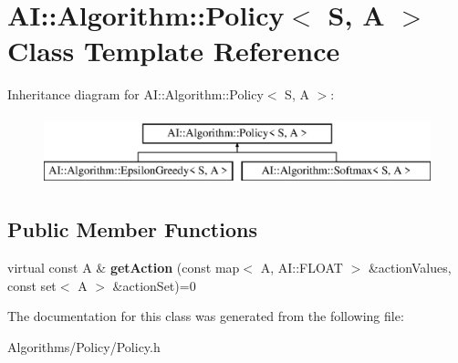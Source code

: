 \hypertarget{classAI_1_1Algorithm_1_1Policy}{\section{A\-I\-:\-:Algorithm\-:\-:Policy$<$ S, A $>$ Class Template Reference}
\label{classAI_1_1Algorithm_1_1Policy}
}
Inheritance diagram for A\-I\-:\-:Algorithm\-:\-:Policy$<$ S, A $>$\-:\begin{figure}[H]
\begin{center}
\leavevmode
\includegraphics[height=2.000000cm]{classAI_1_1Algorithm_1_1Policy}
\end{center}
\end{figure}
\subsection*{Public Member Functions}
\begin{DoxyCompactItemize}
\item 
\hypertarget{classAI_1_1Algorithm_1_1Policy_a11cf22054489f4c1c89b16caa5224284}{virtual const A \& {\bfseries get\-Action} (const map$<$ A, A\-I\-::\-F\-L\-O\-A\-T $>$ \&action\-Values, const set$<$ A $>$ \&action\-Set)=0}\label{classAI_1_1Algorithm_1_1Policy_a11cf22054489f4c1c89b16caa5224284}

\end{DoxyCompactItemize}


The documentation for this class was generated from the following file\-:\begin{DoxyCompactItemize}
\item 
Algorithms/\-Policy/Policy.\-h\end{DoxyCompactItemize}
